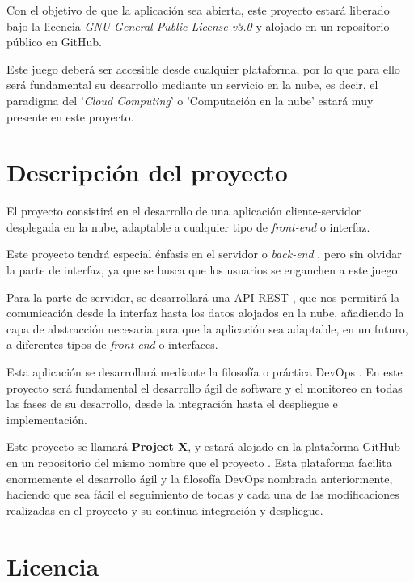 Con el objetivo de que la aplicación sea abierta, este proyecto estará liberado bajo la licencia \textit{GNU General Public License v3.0} \cite{licenciaproyecto} y alojado en un repositorio público en GitHub.

Este juego deberá ser accesible desde cualquier plataforma, por lo que para ello será fundamental su desarrollo mediante un servicio en la nube, es decir, el paradigma del '\textit{Cloud Computing}' o 'Computación en la nube' \cite{nube1} estará muy presente en este proyecto.

\section{Descripción del proyecto}

El proyecto consistirá en el desarrollo de una aplicación cliente-servidor desplegada en la nube, adaptable a cualquier tipo de \textit{front-end} \cite{frontback} o interfaz.

Este proyecto tendrá especial énfasis en el servidor o \textit{back-end} \cite{frontback}, pero sin olvidar la parte de interfaz, ya que se busca que los usuarios se enganchen a este juego.

Para la parte de servidor, se desarrollará una API REST\cite{api1} \cite{api2}\cite{api3}, que nos permitirá la comunicación desde la interfaz hasta los datos alojados en la nube, añadiendo la capa de abstracción necesaria para que la aplicación sea adaptable, en un futuro, a diferentes tipos de \textit{front-end} o interfaces. 

Esta aplicación se desarrollará mediante la filosofía o práctica DevOps \cite{devops1} \cite{devops2} \cite{devops3} \cite{devops4}. En este proyecto será fundamental el desarrollo ágil de software y el monitoreo en todas las fases de su desarrollo, desde la integración hasta el despliegue e implementación.

Este proyecto se llamará \textbf{Project X}, y estará alojado en la plataforma GitHub en un repositorio del mismo nombre que el proyecto \cite{proyectogithub}. Esta plataforma facilita enormemente el desarrollo ágil y la filosofía DevOps nombrada anteriormente, haciendo que sea fácil el seguimiento de todas y cada una de las modificaciones realizadas en el proyecto y su continua integración y despliegue.

\section{Licencia}

